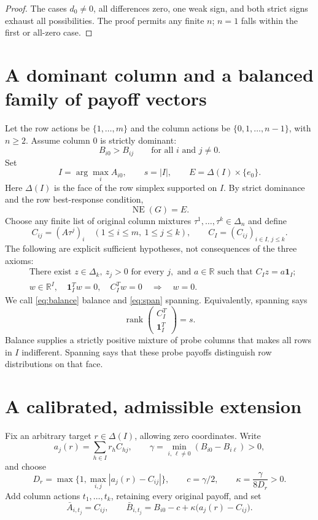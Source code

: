 \documentclass[11pt]{article}
\newcommand{\NE}{\operatorname{NE}}
\newcommand{\rank}{\operatorname{rank}}
\newcommand{\R}{\mathbb R}
\newcommand{\one}{\mathbf 1}
\theoremstyle{definition}
\theoremstyle{remark}
\begin{document}
\begin{proof}
The cases $d_0\ne0$, all differences zero, one weak sign, and both
strict signs exhaust all possibilities. The proof permits any finite
$n$; $n=1$ falls within the first or all-zero case.
\end{proof}


\section{A dominant column and a balanced family of payoff vectors}
Let the row actions be $\{1,\ldots,m\}$ and the column actions be
$\{0,1,\ldots,n-1\}$, with $n\ge2$. Assume column $0$ is strictly
dominant:
\begin{equation}\label{eq:dominance}
 B_{i0}>B_{ij}\qquad\text{for all }i\text{ and }j\ne0.
\end{equation}
Set
\[
 I=\arg\max_i A_{i0},\qquad s=|I|,\qquad
 E=\Delta(I)\times\{e_0\}.
\]
Here $\Delta(I)$ is the face of the row simplex supported on $I$.
By strict dominance and the row best-response condition,
\begin{equation}\label{eq:ne}
 \NE(G)=E.
\end{equation}
Choose any finite list of original column mixtures
$\tau^1,\ldots,\tau^k\in\Delta_n$ and define
\[
 C_{ij}=(A\tau^j)_i\quad(1\le i\le m,\ 1\le j\le k),
 \qquad C_I=(C_{ij})_{i\in I,\,j\le k}.
\]
The following are explicit sufficient hypotheses, not consequences of
the three axioms:
\begin{align}
 &\text{There exist }z\in\Delta_k,\ z_j>0\text{ for every }j,
   \text{ and }a\in\R\text{ such that }C_Iz=a\one_I;
   \label{eq:balance}\\
 &w\in\R^I,\quad\one_I^Tw=0,\quad C_I^Tw=0
   \quad\Longrightarrow\quad w=0.\label{eq:span}
\end{align}
We call \eqref{eq:balance} balance and \eqref{eq:span} spanning.
Equivalently, spanning says
\[
 \rank\begin{pmatrix}C_I^T\\\one_I^T\end{pmatrix}=s.
\]
Balance supplies a strictly positive mixture of probe columns that
makes all rows in $I$ indifferent. Spanning says that these probe
payoffs distinguish row distributions on that face.


\section{A calibrated, admissible extension}
Fix an arbitrary target $r\in\Delta(I)$, allowing zero coordinates.
Write
\[
 a_j(r)=\sum_{h\in I}r_hC_{hj},\qquad
 \gamma=\min_{i,\,\ell\ne0}(B_{i0}-B_{i\ell})>0,
\]
and choose
\[
 D_r=\max\{1,\max_{i,j}|a_j(r)-C_{ij}|\},\qquad
 c=\gamma/2,\qquad\kappa=\frac{\gamma}{8D_r}>0.
\]
Add column actions $t_1,\ldots,t_k$, retaining every original payoff,
and set
\begin{equation}\label{eq:new}
 \bar A_{i,t_j}=C_{ij},\qquad
 \bar B_{i,t_j}=B_{i0}-c+\kappa\bigl(a_j(r)-C_{ij}\bigr).
\end{equation}
\end{document}
